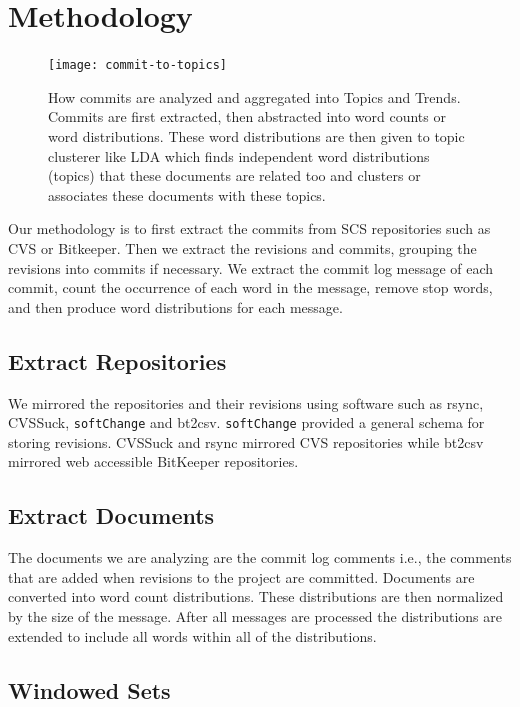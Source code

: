 \documentclass[times, 10pt,twocolumn]{article}
\begin{document}
\section{Methodology}
\begin{figure}
  \centering
  \texttt{[image: commit-to-topics]} 
  \caption{How commits are analyzed and aggregated into Topics and Trends. Commits are first extracted, then abstracted into word counts or word distributions. These word distributions are then given to topic clusterer like LDA which finds independent word distributions (topics) that these documents are related too and clusters or associates these documents with these topics.}
  \label{fig:commits}
\end{figure}

Our methodology is to first extract the commits from SCS repositories
such as CVS or Bitkeeper. Then we extract the revisions and commits,
grouping the revisions into commits if necessary. We extract the
commit log message of each commit, count the occurrence of each word
in the message, remove stop words, and then produce word distributions
for each message.


\subsection{Extract Repositories}

We mirrored the repositories and their revisions using software such
as rsync, CVSSuck, \texttt{softChange} and bt2csv.
\texttt{softChange} provided a general schema for storing
revisions. CVSSuck and rsync mirrored CVS repositories while bt2csv
mirrored web accessible BitKeeper repositories.


\subsection{Extract Documents}

The documents we are analyzing are the commit log comments i.e., the
comments that are added when revisions to the project are committed.
Documents are converted into word count distributions. These
distributions are then normalized by the size of the message. After
all messages are processed the distributions are extended to include
all words within all of the  distributions.

\subsection{Windowed Sets}
\end{document}

